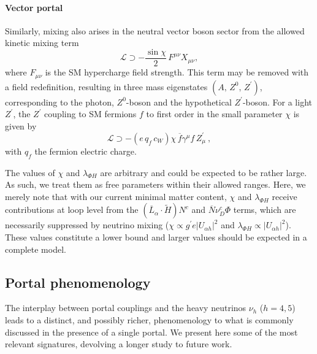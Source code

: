 \paragraph{Vector portal}  Similarly, mixing also arises in the neutral vector boson sector from the allowed kinetic mixing term~\cite{Holdom:1985ag}
%
\begin{equation}
 \mathscr{L} \supset - \frac{\sin{\chi}}{2} \, F^{\mu \nu} X_{\mu \nu},
\end{equation} 
%
where $F_{\mu\nu}$ is the SM hypercharge field strength. This term may be removed with a field redefinition, resulting in three mass eigenstates $\left( A,\, Z^0,\, Z^\prime\right)$, corresponding to the photon, $Z^0$-boson and the hypothetical $Z^\prime$-boson. For a light $Z^\prime$, the $Z^\prime$ coupling to SM fermions $f$ to first order in the small parameter $\chi$ is given by
%
\begin{equation}
\mathscr{L} \supset - (e\,q_f\,c_{W}) \chi \,\overline{f} \gamma^\mu f\,Z^\prime_\mu ~,
\end{equation}
%
with  $q_f$ the fermion electric charge.

The values of $\chi$ and $\lambda_{\Phi H}$ are arbitrary and could be expected to be rather large. As such, we treat them as free parameters within their allowed ranges. Here, we merely note that with our current minimal matter content, $\chi$ and $\lambda_{\Phi H}$ receive contributions at loop level from the $(\overline{L}_\alpha \cdot \widetilde{H})N^c$ and $\overline{N} \nu_D^c \Phi$ terms, which are necessarily suppressed by neutrino mixing ($\chi \propto g^\prime e |U_{\alpha h}|^2$ and $\lambda_{\Phi H} \propto |U_{\alpha h}|^2$). These values constitute a lower bound and larger values should be expected in a complete model.


\subsection{Portal phenomenology} \label{sec:portal_pheno}

The interplay between portal couplings and the heavy neutrinos $\nu_h$ ($h=4,5$) leads to a distinct, and possibly richer, phenomenology to what is commonly discussed in the presence of a single portal. We present here some of the most relevant signatures, devolving a longer study to future work.


